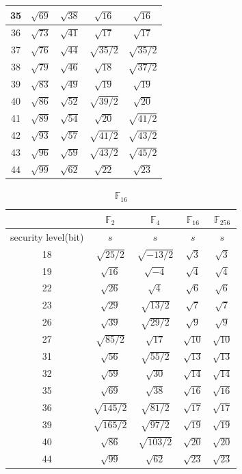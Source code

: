 \begin{table}[]
\begin{tabular}{|c|c|c|c|c|}
35 &$\sqrt{ 69 }$&$\sqrt{ 38 }$&$\sqrt{ 16 }$&$\sqrt{ 16 }$\\ \hline
36 &$\sqrt{ 73 }$&$\sqrt{ 41 }$&$\sqrt{ 17 }$&$\sqrt{ 17 }$\\ \hline
37 &$\sqrt{ 76 }$&$\sqrt{ 44 }$&$\sqrt{ 35/2 }$&$\sqrt{ 35/2 }$\\ \hline
38 &$\sqrt{ 79 }$&$\sqrt{ 46 }$&$\sqrt{ 18 }$&$\sqrt{ 37/2 }$\\ \hline
39 &$\sqrt{ 83 }$&$\sqrt{ 49 }$&$\sqrt{ 19 }$&$\sqrt{ 19 }$\\ \hline
40 &$\sqrt{ 86 }$&$\sqrt{ 52 }$&$\sqrt{ 39/2 }$&$\sqrt{ 20 }$\\ \hline
41 &$\sqrt{ 89 }$&$\sqrt{ 54 }$&$\sqrt{ 20 }$&$\sqrt{ 41/2 }$\\ \hline
42 &$\sqrt{ 93 }$&$\sqrt{ 57 }$&$\sqrt{ 41/2 }$&$\sqrt{ 43/2 }$\\ \hline
43 &$\sqrt{ 96 }$&$\sqrt{ 59 }$&$\sqrt{ 43/2 }$&$\sqrt{ 45/2 }$\\ \hline
44 &$\sqrt{ 99 }$&$\sqrt{ 62 }$&$\sqrt{ 22 }$&$\sqrt{ 23 }$\\ \hline
\end{tabular}
\end{table}

\begin{table}[]
\centering
\caption{$\mathbb{F}_{16}$ }
\label{my-label}
\begin{tabular}{|c|c|c|c|c|}
\hline
                    & $\mathbb{F}_2$           & $\mathbb{F}_4$           & $\mathbb{F}_{16}$          & $\mathbb{F}_{256}$         \\ \hline
security level(bit) & \multicolumn{1}{c|}{$s$} & \multicolumn{1}{c|}{$s$} & \multicolumn{1}{c|}{$s$} & \multicolumn{1}{c|}{$s$} \\  \hline
18 &$\sqrt{ 25/2 }$&$\sqrt{ -13/2 }$&$\sqrt{ 3 }$&$\sqrt{ 3 }$\\ \hline
19 &$\sqrt{ 16 }$&$\sqrt{ -4 }$&$\sqrt{ 4 }$&$\sqrt{ 4 }$\\ \hline
22 &$\sqrt{ 26 }$&$\sqrt{ 4 }$&$\sqrt{ 6 }$&$\sqrt{ 6 }$\\ \hline
23 &$\sqrt{ 29 }$&$\sqrt{ 13/2 }$&$\sqrt{ 7 }$&$\sqrt{ 7 }$\\ \hline
26 &$\sqrt{ 39 }$&$\sqrt{ 29/2 }$&$\sqrt{ 9 }$&$\sqrt{ 9 }$\\ \hline
27 &$\sqrt{ 85/2 }$&$\sqrt{ 17 }$&$\sqrt{ 10 }$&$\sqrt{ 10 }$\\ \hline
31 &$\sqrt{ 56 }$&$\sqrt{ 55/2 }$&$\sqrt{ 13 }$&$\sqrt{ 13 }$\\ \hline
32 &$\sqrt{ 59 }$&$\sqrt{ 30 }$&$\sqrt{ 14 }$&$\sqrt{ 14 }$\\ \hline
35 &$\sqrt{ 69 }$&$\sqrt{ 38 }$&$\sqrt{ 16 }$&$\sqrt{ 16 }$\\ \hline
36 &$\sqrt{ 145/2 }$&$\sqrt{ 81/2 }$&$\sqrt{ 17 }$&$\sqrt{ 17 }$\\ \hline
39 &$\sqrt{ 165/2 }$&$\sqrt{ 97/2 }$&$\sqrt{ 19 }$&$\sqrt{ 19 }$\\ \hline
40 &$\sqrt{ 86 }$&$\sqrt{ 103/2 }$&$\sqrt{ 20 }$&$\sqrt{ 20 }$\\ \hline
44 &$\sqrt{ 99 }$&$\sqrt{ 62 }$&$\sqrt{ 23 }$&$\sqrt{ 23 }$\\ \hline
\end{tabular}
\end{table}
